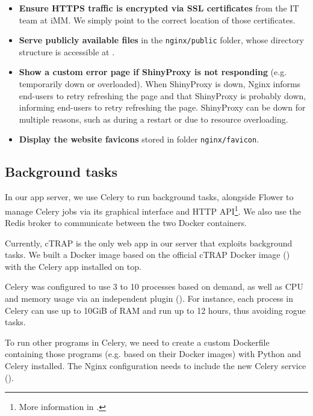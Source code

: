 \begin{itemize}
	\item \textbf{Ensure HTTPS traffic is encrypted via SSL certificates} from the IT team at iMM. We simply point to the correct location of those certificates.%
	\item \textbf{Serve publicly available files} in the \texttt{nginx/public} folder, whose directory structure is accessible at .
	\item \textbf{Show a custom error page if ShinyProxy is not responding} (e.g. temporarily down or overloaded). When ShinyProxy is down, Nginx informs end-users to retry refreshing the page and that ShinyProxy is probably down, informing end-users to retry refreshing the page. ShinyProxy can be down for multiple reasons, such as during a restart or due to resource overloading. %
	\item \textbf{Display the website favicons} stored in folder \texttt{nginx/favicon}.
\end{itemize}

\subsection{Background tasks}
\label{sec:background-tasks}

In our app server, we use Celery to run background tasks, alongside Flower to manage Celery jobs via its graphical interface and HTTP API\footnote{More information in .}. We also use the Redis broker to communicate between the two Docker containers.

Currently, cTRAP is the only web app in our server that exploits background tasks. We built a Docker image based on the official cTRAP Docker image () with the Celery app installed on top.

Celery was configured to use 3 to 10 processes based on demand, as well as CPU and memory usage via an independent plugin (). For instance, each process in Celery can use up to 10GiB of RAM and run up to 12 hours, thus avoiding rogue tasks.

To run other programs in Celery, we need to create a custom Dockerfile containing those programs (e.g. based on their Docker images) with Python and Celery installed. The Nginx configuration needs to include the new Celery service ().

